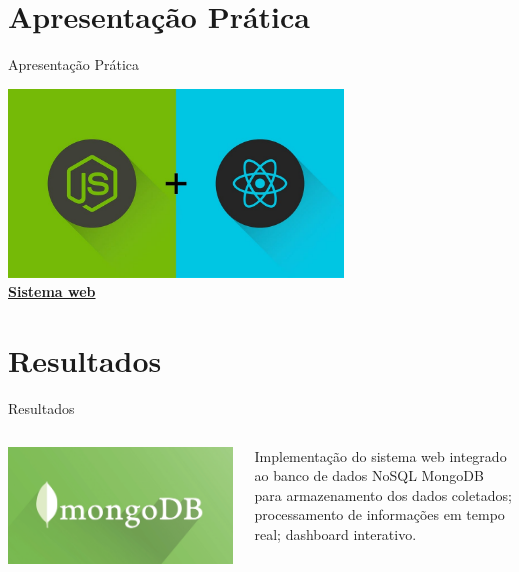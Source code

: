 \documentclass[10pt]{beamer}
\begin{document}
\section{Apresentação Prática}
\begin{frame}{Apresentação Prática}
\centering

\includegraphics[height=5cm]{Javascript.jpg}\\[0.3cm]
{\Large\textbf{\underline{Sistema web}}}

\end{frame}

\section{Resultados}
\begin{frame}{Resultados}

\begin{columns}[T,onlytextwidth]
    \centering
    \includegraphics[width=\textwidth]{mongo.png}
    
    \raggedright
    \begin{minipage}{\linewidth}
    \hspace{0.5cm}\parbox{0.9\linewidth}{\small\textcolor{cpspreto}{Implementação do sistema web integrado ao banco de dados NoSQL MongoDB para armazenamento dos dados coletados; processamento de informações em tempo real; dashboard interativo.}}
    \end{minipage}
\end{columns}

\end{frame}
\end{document}
